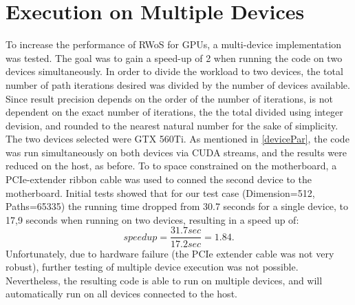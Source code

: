 \section{Execution on Multiple Devices}
To increase the performance of \Gls{RWoS} for \Glspl{GPU}, a multi-device implementation
was tested.  The goal was to gain a speed-up of 2 when running the code on two devices
simultaneously.  In order to divide the workload to two devices, the total number
of path iterations desired was divided by the number of devices available. Since
result precision depends on the order of the number of iterations, is not dependent
on the exact number of iterations, the the total divided using integer devision,
and rounded to the nearest natural number for the sake of simplicity.  The two
devices selected were GTX 560Ti. As mentioned in \ref{devicePar}, the code
was run simultaneously on both devices via CUDA streams, and the results were reduced
on the host, as before. To to space constrained on the motherboard, a PCIe-extender
ribbon cable was used to conned the second device to the motherboard. Initial tests
showed that for our test case (Dimension=512, Paths=65335) the running time dropped from
30.7 seconds for a single device, to 17,9 seconds when running on two devices,
resulting in a speed up of: $$ speedup = \frac{31.7 sec}{17.2 sec} = 1.84.$$ Unfortunately,
due to hardware failure (the PCIe extender cable was not very robust), further testing
of multiple device execution was not possible.  Nevertheless, the resulting code
is able to run on multiple devices, and will automatically run on all devices connected
to the host.

